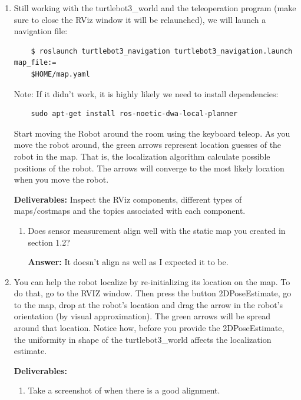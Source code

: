 \documentclass[12pt]{article}
\begin{document}
\begin{enumerate}
    \item Still working with the turtlebot3\_world and the teleoperation program (make sure to close the RViz window it will be relaunched), we will launch a navigation file:
     \begin{verbatim}
    $ roslaunch turtlebot3_navigation turtlebot3_navigation.launch map_file:=
    $HOME/map.yaml
         \end{verbatim}
         
    Note: If it didn't work, it is highly likely we need to install dependencies:
    \begin{verbatim}
    sudo apt-get install ros-noetic-dwa-local-planner
    \end{verbatim}
    Start moving the Robot around the room using the keyboard teleop. As you move the robot around, the green arrows represent location guesses of the robot in the map. That is, the localization algorithm calculate possible positions of the robot. The arrows will converge to the most likely location when you move the robot.
    
    \textbf{Deliverables:}
    Inspect the RViz components, different types of maps/costmaps and the topics associated with each component.
    
    \begin{enumerate}
        \item Does sensor measurement align well with the static map you created in section 1.2?
        
        \textbf{Answer: }It doesn't align as well as I expected it to be.
        
    \end{enumerate}
    \item You can help the robot localize by re-initializing its location on the map. To do that, go to the RVIZ window. Then press the button 2DPoseEstimate, go to the map, drop at the robot's location and drag the arrow in the robot's orientation (by visual approximation). The green arrows will be spread around that location. Notice how, before you provide the 2DPoseEstimate, the uniformity in shape of the turtlebot3\_world affects the localization estimate.
    
    \textbf{Deliverables:}
    \begin{enumerate}
        \item Take a screenshot of when there is a good alignment.
        

\end{enumerate}
\end{enumerate}
\end{document}
